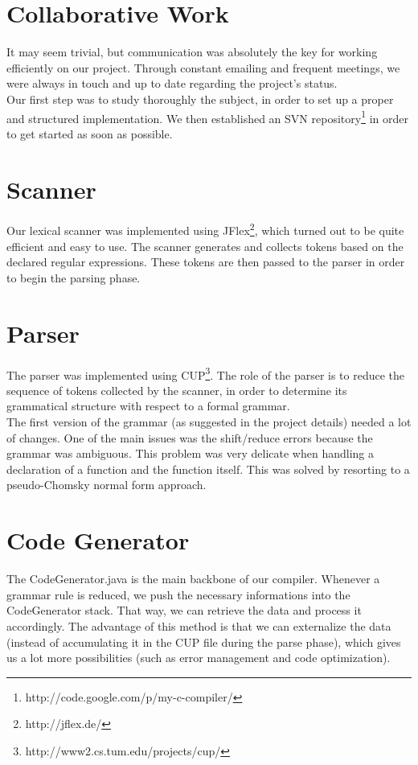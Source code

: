 \documentclass{article}
\begin{document}
\section{Collaborative Work}
It may seem trivial, but communication was absolutely the key for working efficiently on our project. Through constant emailing and frequent meetings, we were always in touch and up to date regarding the project's status.\\
Our first step was to study thoroughly the subject, in order to set up a proper and structured implementation.
We then established an SVN repository\footnote{http://code.google.com/p/my-c-compiler/} in order to get started as soon as possible.

\section{Scanner}
Our lexical scanner was implemented using JFlex\footnote{http://jflex.de/}, which turned out to be quite efficient and easy to use. The scanner generates and collects tokens based on the declared regular expressions. These tokens are then passed to the parser in order to begin the parsing phase.

\section{Parser}
The parser was implemented using CUP\footnote{http://www2.cs.tum.edu/projects/cup/}. The role of the parser is to reduce the sequence of tokens collected by the scanner, in order to determine its grammatical structure with respect to a formal grammar.\\
The first version of the grammar (as suggested in the project details) needed a lot of changes. One of the main issues was the shift/reduce errors because the grammar was ambiguous. This problem was very delicate when handling a declaration of a function and the function
itself. This was solved by resorting to a pseudo-Chomsky normal form approach.

\section{Code Generator}
The CodeGenerator.java is the main backbone of our compiler. Whenever a grammar rule is reduced, we push the necessary informations into the CodeGenerator stack. That way, we can retrieve the data and process it accordingly. The advantage of this method is that we can externalize the data (instead of accumulating it in the CUP file during the parse phase), which gives us a lot more possibilities (such as error management and code optimization).
\end{document}
